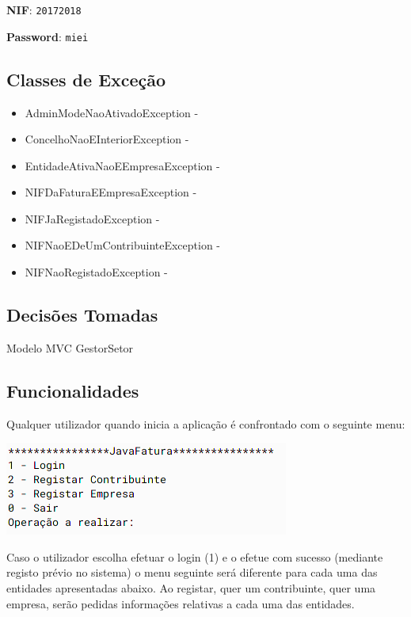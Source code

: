 \documentclass[a4paper]{article}
\begin{document}
\textbf{NIF}: \texttt{20172018}

\textbf{Password}: \texttt{miei}



\subsection{Classes de Exceção}
\label{exceptions}

  \begin{itemize}
  	\item{AdminModeNaoAtivadoException - } 
    \item{ConcelhoNaoEInteriorException - } 
    \item{EntidadeAtivaNaoEEmpresaException - } 
    \item{NIFDaFaturaEEmpresaException - }
    \item{NIFJaRegistadoException - } 
    \item{NIFNaoEDeUmContribuinteException - }
    \item{NIFNaoRegistadoException - }
  \end{itemize}


\subsection{Decisões Tomadas}
\label{sec:decisoes}

Modelo MVC
GestorSetor



\subsection{Funcionalidades}
\label{sec:funcionalidades}

Qualquer utilizador quando inicia a aplicação é confrontado com o seguinte menu:

	\includegraphics[width=.6\linewidth]{main_menu.png}

Caso o utilizador escolha efetuar o login (1) e o efetue com sucesso (mediante registo prévio no sistema)
o menu seguinte será diferente para cada uma das entidades apresentadas abaixo.
Ao registar, quer um contribuinte, quer uma empresa, serão pedidas informações relativas a cada uma das entidades.
\end{document}
